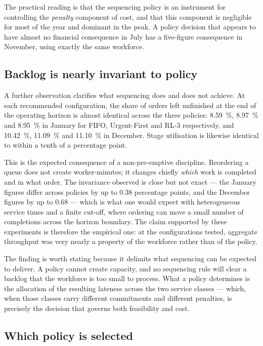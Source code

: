 The practical reading is that the sequencing policy is an instrument for controlling the
\emph{penalty} component of cost, and that this component is negligible for most of the year and
dominant in the peak. A policy decision that appears to have almost no financial consequence in
July has a five-figure consequence in November, using exactly the same workforce.

\subsection{Backlog is nearly invariant to policy}
\label{sec:res-backlog}

A further observation clarifies what sequencing does and does not achieve. At each recommended
configuration, the share of orders left unfinished at the end of the operating horizon is almost
identical across the three policies: \SI{8.59}{\percent}, \SI{8.97}{\percent} and
\SI{8.95}{\percent} in January for FIFO, Urgent-First and RL-3 respectively, and
\SI{10.42}{\percent}, \SI{11.09}{\percent} and \SI{11.10}{\percent} in December. Stage
utilisation is likewise identical to within a tenth of a percentage point.

This is the expected consequence of a non-pre-emptive discipline. Reordering a queue does not
create worker-minutes; it changes chiefly \emph{which} work is completed and in what order. The
invariance observed is close but not exact --- the January figures differ across policies by up
to \num{0.38} percentage points, and the December figures by up to \num{0.68} --- which is what
one would expect with heterogeneous service times and a finite cut-off, where ordering can move
a small number of completions across the horizon boundary. The claim supported by these
experiments is therefore the empirical one: at the configurations tested, aggregate throughput
was very nearly a property of the workforce rather than of the policy.

The finding is worth stating because it delimits what sequencing can be expected to deliver. A
policy cannot create capacity, and no sequencing rule will clear a backlog that the workforce is
too small to process. What a policy determines is the allocation of the resulting lateness
across the two service classes --- which, when those classes carry different commitments and
different penalties, is precisely the decision that governs both feasibility and cost.

\subsection{Which policy is selected}

